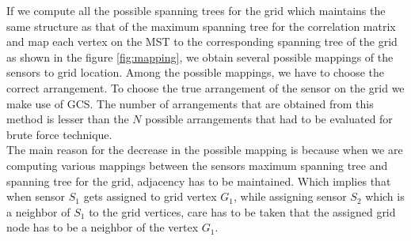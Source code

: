 If we compute all the possible spanning trees for the grid which maintains the same structure as that of the maximum spanning tree for the correlation matrix and map each vertex on the MST to the corresponding spanning tree of the grid as shown in the figure \ref{fig:mapping}, we obtain several possible mappings of the sensors to grid location. Among the possible mappings, we have to choose the correct arrangement. To choose the true arrangement of the sensor on the grid we make use of  GCS. 
The number of arrangements that are obtained from this method is lesser than the ${N}$  possible arrangements that had to be evaluated for brute force technique. \\
The main reason for the decrease in the possible mapping is because when we are computing various mappings between the sensors maximum spanning tree and spanning tree for the grid, adjacency has to be maintained. Which implies that when sensor $S_1$ gets assigned to grid vertex $G_1$, while assigning sensor $S_2$ which is a neighbor of $S_1$ to the grid vertices, care has to be taken that the assigned grid node has to be a neighbor of the vertex $G_1$.















